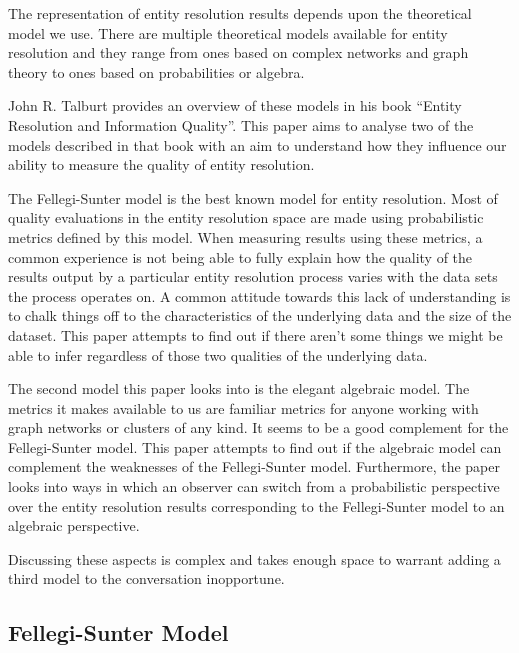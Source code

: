 \documentclass[journal]{IEEEtran}
\begin{document}
    The representation of entity resolution results depends upon the theoretical
    model we use.
    There are multiple theoretical models available for entity resolution and
    they range from ones based on complex networks and graph theory\cite{Li2020}
    to ones based on probabilities\cite{fs1969} or
    algebra\cite{Tal11,Ben2009Swoosh}.

    John R. Talburt provides an overview of these models in his book ``Entity
    Resolution and Information Quality''\cite{Tal11}.
    This paper aims to analyse two of the models described in that book with an
    aim to understand how they influence our ability to measure the quality of
    entity resolution.

    The Fellegi-Sunter model is the best known model for entity resolution.
    Most of quality evaluations in the entity resolution space are made using
    probabilistic metrics defined by this model.
    When measuring results using these metrics, a common experience is not being
    able to fully explain how the quality of the results output by a particular
    entity resolution process varies with the data sets the process operates on.
    A common attitude towards this lack of understanding is to chalk things off
    to the characteristics of the underlying data and the size of the dataset.
    This paper attempts to find out if there aren't some things we might be able
    to infer regardless of those two qualities of the underlying data.

    The second model this paper looks into is the elegant algebraic model.
    The metrics it makes available to us are familiar metrics for anyone working
    with graph networks or clusters of any kind.
    It seems to be a good complement for the Fellegi-Sunter model.
    This paper attempts to find out if the algebraic model can complement the
    weaknesses of the Fellegi-Sunter model.
    Furthermore, the paper looks into ways in which an observer can switch from
    a probabilistic perspective over the entity resolution results corresponding
    to the Fellegi-Sunter model to an algebraic perspective.

    Discussing these aspects is complex and takes enough space to warrant adding
    a third model to the conversation inopportune.

    \subsection[fsm]{Fellegi-Sunter Model}\label{subsec:fsm}
\end{document}

